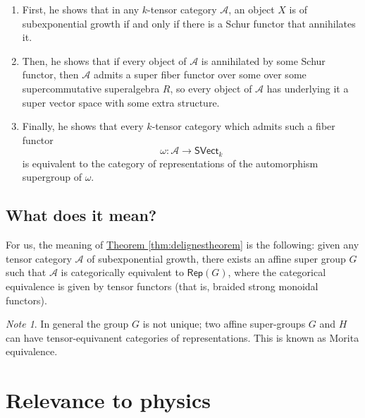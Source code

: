 \documentclass[a4paper,10pt]{scrreprt}
\theoremstyle{definition}
\theoremstyle{plain}
\theoremstyle{remark}
\newtheorem{note}{Note}[section]
\begin{document}
\begin{enumerate}
  \item \label{item:proofsketch1} First, he shows that in any $k$-tensor category $\mathscr{A}$, an object $X$ is of subexponential growth if and only if there is a Schur functor that annihilates it.

  \item \label{item:proofsketch2} Then, he shows that if every object of $\mathscr{A}$ is annihilated by some Schur functor, then $\mathscr{A}$ admits a super fiber functor over some over some supercommutative superalgebra $R$, so every object of $\mathscr{A}$ has underlying it a super vector space with some extra structure.

  \item \label{item:proofsketch3} Finally, he shows that every $k$-tensor category which admits such a fiber functor 
    \begin{equation*}
      \omega\colon \mathscr{A} \to \mathsf{SVect}_{k}
    \end{equation*}
    is equivalent to the category of representations of the automorphism supergroup of $\omega$.
\end{enumerate}

\section{What does it mean?}
For us, the meaning of \hyperref[thm:delignestheorem]{Theorem \ref*{thm:delignestheorem}} is the following: given any tensor category $\mathscr{A}$ of subexponential growth, there exists an affine super group $G$ such that $\mathscr{A}$ is categorically equivalent to $\mathsf{Rep}(G)$, where the categorical equivalence is given by tensor functors (that is, braided strong monoidal functors).

\begin{note}
  In general the group $G$ is not unique; two affine super-groups $G$ and $H$ can have tensor-equivanent categories of representations. This is known as Morita equivalence.
\end{note}

\chapter{Relevance to physics} \label{ch:relevancetophysics}


\end{document}
